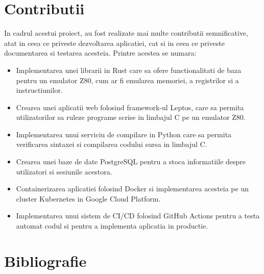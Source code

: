 \documentclass[titlepage,12pt]{article}
\begin{document}
\clearpage
\section{Contributii}
In cadrul acestui proiect, au fost realizate mai multe contributii semnificative, atat in ceea ce priveste dezvoltarea aplicatiei, cat si in ceea ce priveste documentarea si testarea acesteia. Printre acestea se numara:
\begin{itemize}
    \item Implementarea unei librarii in Rust care sa ofere functionalitati de baza pentru un emulator Z80, cum ar fi emularea memoriei, a registrilor si a instructiunilor.
    \item Crearea unei aplicatii web folosind framework-ul Leptos, care sa permita utilizatorilor sa ruleze programe scrise in limbajul C pe un emulator Z80.
    \item Implementarea unui serviciu de compilare in Python care sa permita verificarea sintaxei si compilarea codului sursa in limbajul C.
    \item Crearea unei baze de date PostgreSQL pentru a stoca informatiile despre utilizatori si sesiunile acestora.
    \item Containerizarea aplicatiei folosind Docker si implementarea acesteia pe un cluster Kubernetes in Google Cloud Platform.
    \item Implementarea unui sistem de CI/CD folosind GitHub Actions pentru a testa automat codul si pentru a implementa aplicatia in productie.
\end{itemize}

\clearpage
\section{Bibliografie}
\printbibliography
\end{document}
